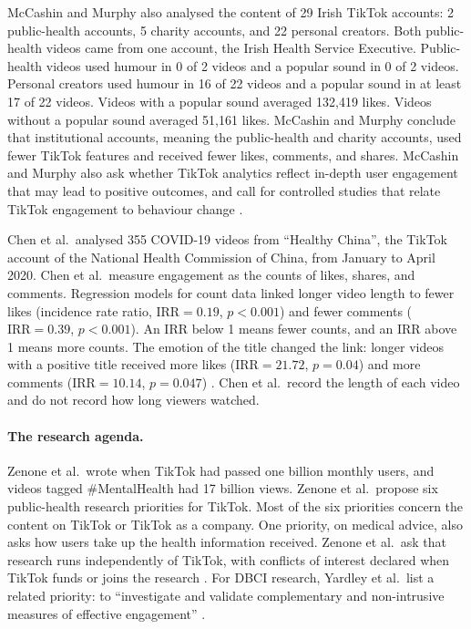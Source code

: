 \documentclass[12pt,a4paper]{report}
\begin{document}
McCashin and Murphy also analysed the content of 29 Irish TikTok accounts: 2 public-health accounts, 5 charity accounts, and 22 personal creators. Both public-health videos came from one account, the Irish Health Service Executive. Public-health videos used humour in 0 of 2 videos and a popular sound in 0 of 2 videos. Personal creators used humour in 16 of 22 videos and a popular sound in at least 17 of 22 videos. Videos with a popular sound averaged 132{,}419 likes. Videos without a popular sound averaged 51{,}161 likes. McCashin and Murphy conclude that institutional accounts, meaning the public-health and charity accounts, used fewer TikTok features and received fewer likes, comments, and shares. McCashin and Murphy also ask whether TikTok analytics reflect in-depth user engagement that may lead to positive outcomes, and call for controlled studies that relate TikTok engagement to behaviour change \cite{mccashin_using_2023}.

Chen et al.\ analysed 355 COVID-19 videos from ``Healthy China'', the TikTok account of the National Health Commission of China, from January to April 2020. Chen et al.\ measure engagement as the counts of likes, shares, and comments. Regression models for count data linked longer video length to fewer likes (incidence rate ratio, $\text{IRR}=0.19$, $p<0.001$) and fewer comments ($\text{IRR}=0.39$, $p<0.001$). An IRR below 1 means fewer counts, and an IRR above 1 means more counts. The emotion of the title changed the link: longer videos with a positive title received more likes ($\text{IRR}=21.72$, $p=0.04$) and more comments ($\text{IRR}=10.14$, $p=0.047$) \cite{chen_factors_2021}. Chen et al.\ record the length of each video and do not record how long viewers watched.

\paragraph{The research agenda.} Zenone et al.\ wrote when TikTok had passed one billion monthly users, and videos tagged \#MentalHealth had 17 billion views. Zenone et al.\ propose six public-health research priorities for TikTok. Most of the six priorities concern the content on TikTok or TikTok as a company. One priority, on medical advice, also asks how users take up the health information received. Zenone et al.\ ask that research runs independently of TikTok, with conflicts of interest declared when TikTok funds or joins the research \cite{zenone_tiktok_2021}. For DBCI research, Yardley et al.\ list a related priority: to ``investigate and validate complementary and non-intrusive measures of effective engagement'' \cite{yardley_understanding_2016}.
\end{document}
